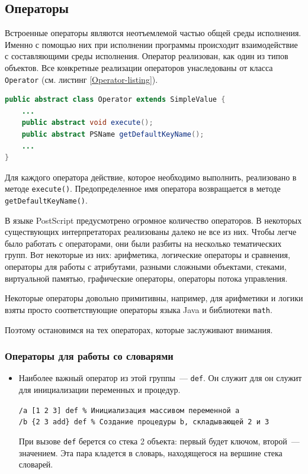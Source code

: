 \documentclass[14pt]{extarticle}
\begin{document}
\subsection{Операторы}
Встроенные операторы являются неотъемлемой частью общей среды исполнения. Именно с помощью них при исполнении программы происходит взаимодействие с составляющими среды исполнения. Оператор реализован, как один из типов объектов. Все конкретные реализации операторов унаследованы от класса \texttt{Operator} (см. листинг \ref{Operator-listing}).

\begin{lstlisting}[label=Operator-listing,caption=Абстракный класс Operator, frame = none, language = Java]
public abstract class Operator extends SimpleValue {
    ...
    public abstract void execute();
    public abstract PSName getDefaultKeyName();
    ...
} 
\end{lstlisting}
Для каждого оператора действие, которое необходимо выполнить, реализовано в методе \texttt{execute()}. Предопределенное имя оператора возвращается в методе \texttt{getDefaultKeyName()}.

В языке PostScript предусмотрено огромное количество операторов. В некоторых существующих интерпретаторах реализованы далеко не все из них. Чтобы легче было работать с операторами, они были разбиты на несколько тематических групп. Вот некоторые из них: арифметика, логические операторы и сравнения, операторы для работы с атрибутами, разными сложными объектами, стеками, виртуальной памятью, графические операторы, операторы потока управления.

Некоторые операторы довольно примитивны, например, для арифметики и логики взяты просто соответствующие операторы языка Java и библиотеки \texttt{math}. 

\iffalse Поэтому остановимся на тех операторах, которые заслуживают внимания.
\subsubsection*{Операторы для работы со словарями}
\begin{itemize}
\item Наиболее важный оператор из этой группы~--- \texttt{def}. Он служит для он служит для инициализации переменных и процедур.

\texttt{/a [1 2 3] def \% Инициализация массивом переменной a \\
/b \{2 3 add\} def \% Создание процедуры b, складывающей 2 и 3
}

При вызове \texttt{def} берется со стека 2 объекта: первый будет ключом, второй~--- значением. Эта пара кладется в словарь, находящегося на вершине стека словарей.
\end{itemize}
\end{document}
